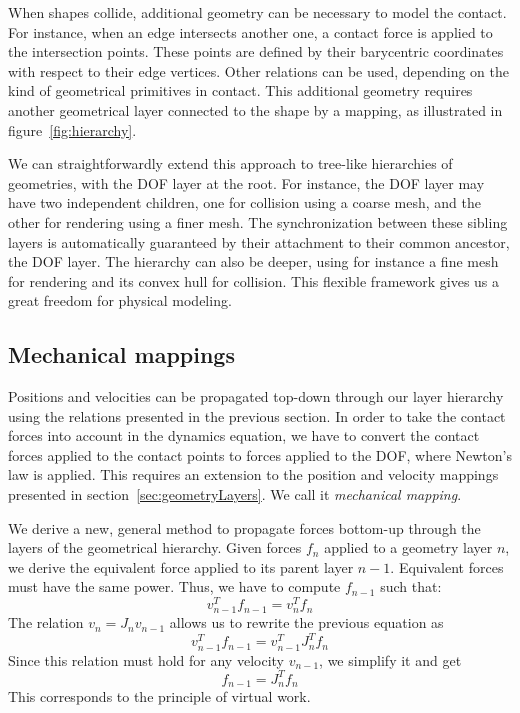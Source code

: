 When shapes collide, additional geometry can be necessary to model the contact.
For instance, when an edge intersects another one, a contact force is applied to the intersection points.
These points are defined by their barycentric coordinates with respect to their edge vertices. Other relations can be used, depending on the kind of geometrical primitives in contact.
This additional geometry requires another geometrical layer connected to the shape by a mapping, as illustrated in figure~\ref{fig:hierarchy}.

We can straightforwardly extend this approach to tree-like hierarchies of geometries, with the DOF layer at the root. 
For instance, the DOF layer may have two independent children, one for collision using a coarse mesh, and the other for rendering using a finer mesh. The synchronization between these sibling layers is automatically guaranteed by their attachment to their common ancestor, the DOF layer.
The hierarchy can also be deeper, using for instance a fine mesh for rendering and its convex hull for collision.
This flexible framework gives us a great freedom for physical modeling.

\subsection{Mechanical mappings}
Positions and velocities can be propagated top-down through our layer hierarchy using the relations presented in the previous section.
In order to take the contact forces into account in the dynamics equation, we have to convert the contact forces applied to the contact points to forces applied to the DOF, where Newton's law is applied. 
This requires an extension to the position and velocity mappings presented in section~\ref{sec:geometryLayers}. We call it \textit{mechanical mapping}.

We derive a new, general method to propagate forces bottom-up through the layers of the geometrical hierarchy.
Given forces $f_n$ applied to a geometry layer $n$, we derive the equivalent force applied to its parent layer $n-1$. 
Equivalent forces must have the same power. Thus, we have to compute $f_{n-1}$ such that:
$$
v_{n-1}^T f_{n-1} = v_n^T f_n
$$
The relation $v_{n} = J_{n}v_{n-1}$ allows us to rewrite the previous equation as
$$
v_{n-1}^T f_{n-1} = v_{n-1}^T J_{n}^T f_n
$$
Since this relation must hold for any velocity $v_{n-1}$, we simplify it and get
\begin{equation} \label{eq:mapF}
f_{n-1} = J_n^T f_n
\end{equation}
This corresponds to the principle of virtual work.

